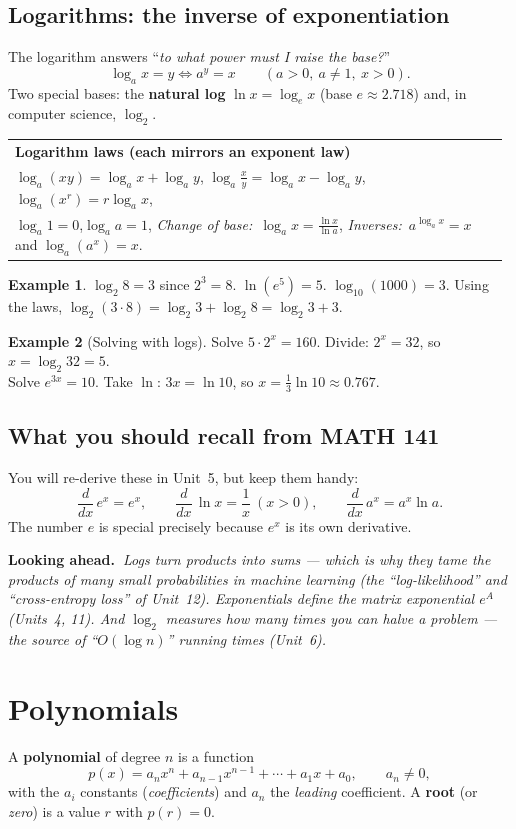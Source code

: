 \documentclass[11pt]{article}
\makeatletter
\theoremstyle{definition}
\newtheorem{example}{Example}[section]
\newcommand{\keybox}[2]{%
  \par\smallskip\noindent
  \begin{tabular}{@{}p{0.985\linewidth}@{}}
  \arrayrulecolor{RoyalBlue}\toprule
  {\sffamily\bfseries\color{RoyalBlue}#1}\\[2pt]#2\\
  \bottomrule
  \end{tabular}\par\smallskip}
\newcommand{\lookahead}[1]{%
  \par\smallskip\noindent
  {\sffamily\bfseries\color{BrickRed}Looking ahead.~}\textit{#1}\par\smallskip}
\newcommand{\ds}{\displaystyle}
\makeatother
\begin{document}
\subsection{Logarithms: the inverse of exponentiation}
The logarithm answers ``\emph{to what power must I raise the base?}''
\[
\log_a x = y \iff a^{y}=x \qquad (a>0,\ a\neq 1,\ x>0).
\]
Two special bases: the \textbf{natural log} $\ln x=\log_e x$ (base $e\approx2.718$)
and, in computer science, $\log_2$.

\keybox{Logarithm laws (each mirrors an exponent law)}{%
$\ds\log_a(xy)=\log_a x+\log_a y$,\qquad
$\ds\log_a\!\frac{x}{y}=\log_a x-\log_a y$,\qquad
$\ds\log_a(x^r)=r\log_a x$,\\[4pt]
$\ds\log_a 1=0$,\qquad $\ds\log_a a=1$,\qquad
\emph{Change of base:}\ $\ds\log_a x=\frac{\ln x}{\ln a}$,\qquad
\emph{Inverses:}\ $a^{\log_a x}=x$ and $\log_a(a^x)=x$.}

\begin{example}
$\log_2 8 = 3$ since $2^3=8$. \quad $\ln(e^5)=5$. \quad
$\log_{10}(1000)=3$. \quad Using the laws,
$\log_2(3\cdot 8)=\log_2 3+\log_2 8=\log_2 3+3.$
\end{example}

\begin{example}[Solving with logs]
Solve $5\cdot 2^{x}=160$. Divide: $2^x=32$, so $x=\log_2 32 = 5$. \\
Solve $e^{3x}=10$. Take $\ln$: $3x=\ln 10$, so $x=\tfrac13\ln 10\approx 0.767$.
\end{example}

\subsection{What you should recall from MATH 141}
You will re-derive these in Unit~5, but keep them handy:
\[
\frac{d}{dx}\,e^{x}=e^{x},\qquad \frac{d}{dx}\,\ln x=\frac{1}{x}\ (x>0),\qquad
\frac{d}{dx}\,a^{x}=a^{x}\ln a.
\]
The number $e$ is special precisely because $e^x$ is its own derivative.

\lookahead{Logs turn products into sums --- which is why they tame the products of
many small probabilities in machine learning (the ``log-likelihood'' and
``cross-entropy loss'' of Unit~12). Exponentials define the matrix exponential
$e^{A}$ (Units~4, 11). And $\log_2$ measures how many times you can halve a
problem --- the source of ``$O(\log n)$'' running times (Unit~6).}

\section{Polynomials}
A \textbf{polynomial} of degree $n$ is a function
\[
p(x)=a_n x^n + a_{n-1}x^{n-1}+\cdots+a_1 x + a_0,\qquad a_n\neq 0,
\]
with the $a_i$ constants (\emph{coefficients}) and $a_n$ the \emph{leading}
coefficient. A \textbf{root} (or \emph{zero}) is a value $r$ with $p(r)=0$.
\end{document}
